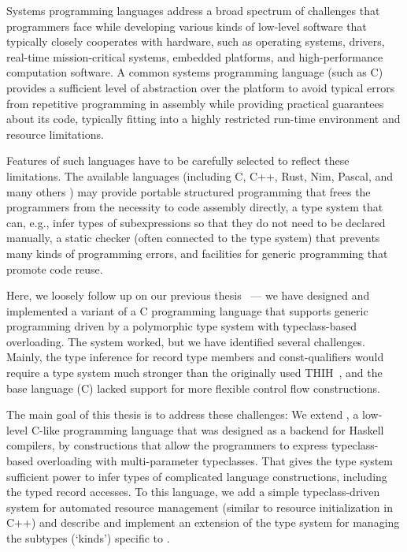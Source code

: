 
Systems programming languages address a broad spectrum of challenges that programmers face while developing various kinds of low-level software that typically closely cooperates with hardware, such as operating systems, drivers, real-time mission-critical systems, embedded platforms, and high-performance computation software.
A common systems programming language (such as C) provides a sufficient level of abstraction over the platform to avoid typical errors from repetitive programming in assembly while providing practical guarantees about its code, typically fitting into a highly restricted run-time environment and resource limitations.

Features of such languages have to be carefully selected to reflect these limitations.
The available languages (including C, C++, Rust, Nim, Pascal, and many others \cite{stroustrup1999overview,matsakis2014rust,picheta2017nim,sammet1971brief}) may provide portable structured programming that frees the programmers from the necessity to code assembly directly, a type system that can, e.g., infer types of subexpressions so that they do not need to be declared manually, a static checker (often connected to the type system) that prevents many kinds of programming errors, and facilities for generic programming that promote code reuse.

Here, we loosely follow up on our previous thesis~\cite{klepl2020type} --- we have designed and implemented a variant of a C programming language that supports generic programming driven by a polymorphic type system with typeclass-based overloading.
The system worked, but we have identified several challenges.
Mainly, the type inference for record type members and const-qualifiers would require a type system much stronger than the originally used THIH~\cite{jones1999typing}, and the base language (C) lacked support for more flexible control flow constructions.

The main goal of this thesis is to address these challenges: We extend \cmm, a low-level C-like programming language that was designed as a backend for Haskell compilers, by constructions that allow the programmers to express typeclass-based overloading with multi-parameter typeclasses. That gives the type system sufficient power to infer types of complicated language constructions, including the typed record accesses. To this language, we add a simple typeclass-driven system for automated resource management (similar to resource initialization in C++) and describe and implement an extension of the type system for managing the subtypes (`kinds') specific to \cmm.

